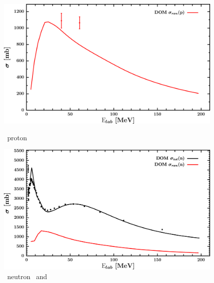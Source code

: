 \begin{figure}[hbtp]
    \centering
    \begin{minipage}{0.47\textwidth}
        \centering
        \includegraphics[width=\linewidth]{figures/ni64_protonInelastic.png}
        \caption*{\niFour\ proton \rxn}
        \label{DOMFitData_ni64_proton_inelastic}
    \end{minipage}\hspace{6pt}
    \begin{minipage}{0.47\textwidth}
        \centering
        \includegraphics[width=\textwidth]{figures/ni64_neutronInelastic.png}
        \caption*{\niFour\ neutron \rxn\ and \tot}
        \label{DOMFitData_ni64_neutron_inelastic}
    \end{minipage}
\end{figure}
\afterpage{\clearpage}
